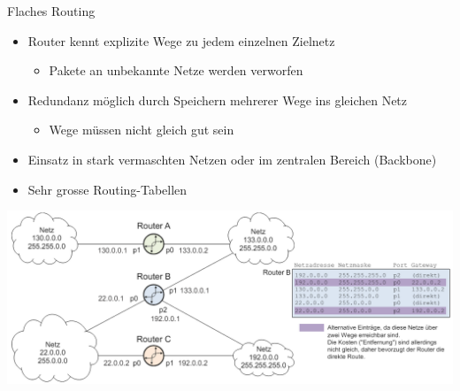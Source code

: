 \begin{concept}{Flaches Routing}
    \begin{itemize}
        \item Router kennt explizite Wege zu jedem einzelnen Zielnetz
        \begin{itemize}
            \item Pakete an unbekannte Netze werden verworfen
        \end{itemize}
        \item Redundanz möglich durch Speichern mehrerer Wege ins gleichen Netz
        \begin{itemize}
            \item Wege müssen nicht gleich gut sein
        \end{itemize}
        \item Einsatz in stark vermaschten Netzen oder im zentralen Bereich (Backbone)
        \item Sehr grosse Routing-Tabellen
    \end{itemize}
        \includegraphics[width=1\linewidth]{images/flaches_routing.png}
\end{concept}

